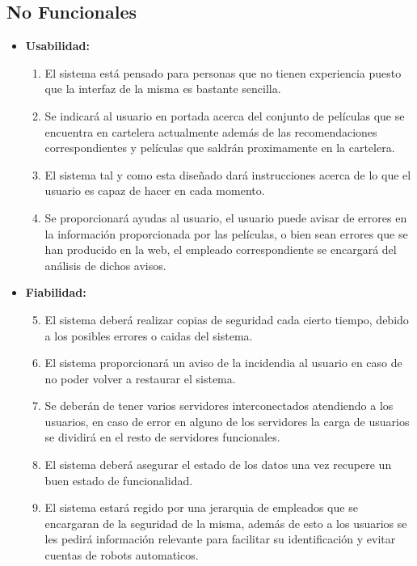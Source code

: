 \documentclass{article}
\begin{document}
	    
    \subsection{No Funcionales}
    \begin{itemize}
    \item \textbf{Usabilidad:}
        \begin{enumerate}[label=\bfseries RNF- \arabic*:]
        \item El sistema está pensado para personas que no tienen experiencia puesto que la interfaz de la misma es bastante sencilla.
        \item Se indicará al usuario en portada acerca del conjunto de películas que se encuentra en cartelera actualmente además de las recomendaciones correspondientes y películas que saldrán proximamente en la cartelera.
        \item El sistema tal y como esta diseñado dará instrucciones acerca de lo que el usuario es capaz de hacer en cada momento.
        \item Se proporcionará ayudas al usuario, el usuario puede avisar de errores en la información proporcionada por las películas, o bien sean errores que se han producido en la web, el empleado correspondiente se encargará del análisis de dichos avisos. 
        \end{enumerate}
        
    \item \textbf{Fiabilidad:}
        \begin{enumerate}[label=\bfseries RNF- \arabic*:]
        \setcounter{enumi}{4}
        \item El sistema deberá realizar copias de seguridad cada cierto tiempo, debido a los posibles errores o caidas del sistema.
        \item El sistema proporcionará un aviso de la incidendia al usuario en caso de no poder volver a restaurar el sistema.
        \item Se deberán de tener varios servidores interconectados atendiendo a los usuarios, en caso de error en alguno de los servidores la carga de usuarios se dividirá en el resto de servidores funcionales.
        \item El sistema deberá asegurar el estado de los datos una vez recupere un buen estado de funcionalidad.
        \item El sistema estará regido por una jerarquia de empleados que se encargaran de la seguridad de la misma, además de esto a los usuarios se les pedirá información relevante para facilitar su identificación y evitar cuentas de robots automaticos. 
        \end{enumerate}
        

\end{itemize}
\end{document}
